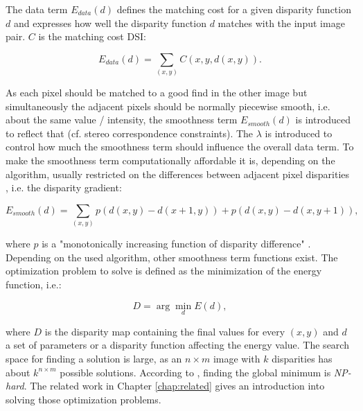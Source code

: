 \noindent The data term $E_{data}(d)$ defines the matching cost for a given disparity function $d$ and expresses how well the disparity function $d$ matches with the input image pair.
$C$ is the matching cost DSI:

\begin{equation}
  E_{data}(d) = \sum_{(x,y)} C(x,y,d(x,y)).
\end{equation}

\noindent As each pixel should be matched to a good find in the other image but simultaneously the adjacent pixels should be normally piecewise smooth, i.e. about the same value / intensity, the smoothness term $E_{smooth}(d)$ is introduced to reflect that (cf. stereo correspondence constraints).
The $\lambda$ is introduced to control how much the smoothness term should influence the overall data term.
To make the smoothness term computationally affordable it is, depending on the algorithm, usually restricted on the differences between adjacent pixel disparities \citep{scharstein2002taxonomy, cyganek2011introduction}, i.e. the disparity gradient:

\begin{equation}
  E_{smooth}(d) = \sum_{(x,y)} p(d(x,y) - d(x+1,y)) + p(d(x,y) - d(x,y+1)),
\end{equation}

\noindent where $p$ is a "monotonically increasing function of disparity difference" \citep{scharstein2002taxonomy}.
Depending on the used algorithm, other smoothness term functions exist.
The optimization problem to solve is defined as the minimization of the energy function, i.e.:

\begin{equation}
  D = \arg\min_{d} E(d),
\end{equation}

\noindent where $D$ is the disparity map containing the final values for every $(x,y)$ and $d$ a set of parameters or a disparity function affecting the energy value.
\newline\newline\noindent The search space for finding a solution is large, as an $n \times m$ image with $k$ disparities has about $k^{n \times m}$ possible solutions.
According to \citeauthor{scharstein2002taxonomy} \citep{scharstein2002taxonomy}, \citeauthor{cyganek2011introduction} \citep{cyganek2011introduction} finding the global minimum is \textit{NP-hard}.
The related work in Chapter \ref{chap:related} gives an introduction into solving those optimization problems.

